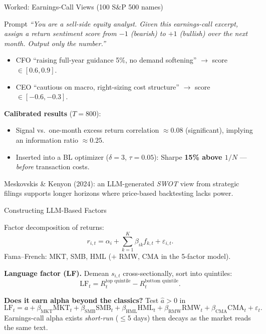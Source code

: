 \documentclass[9pt,t]{beamer}
\begin{document}
\begin{frame}{Worked: Earnings-Call Views (100 S\&P 500 names)}
\begin{exampleblock}{Prompt}
\textit{``You are a sell-side equity analyst. Given this earnings-call excerpt, assign
a return sentiment score from $-1$ (bearish) to $+1$ (bullish) over the next month.
Output only the number.''}
\end{exampleblock}

\begin{itemize}
  \item CFO ``raising full-year guidance 5\%, no demand softening'' $\to$ score $\in[0.6,0.9]$.
  \item CEO ``cautious on macro, right-sizing cost structure'' $\to$ score $\in[-0.6,-0.3]$.
\end{itemize}

\medskip
\textbf{Calibrated results} ($T=800$):
\begin{itemize}
  \item Signal vs.\ one-month excess return correlation $\approx 0.08$ (significant),
        implying an information ratio $\approx 0.25$.
  \item Inserted into a BL optimizer ($\delta=3$, $\tau=0.05$): Sharpe
        \textbf{15\% above $1/N$} --- \emph{before} transaction costs.
\end{itemize}

\medskip
\footnotesize Meskovskis \& Kenyon (2024): an LLM-generated \emph{SWOT} view from strategic
filings supports longer horizons where price-based backtesting lacks power.
\end{frame}

\begin{frame}{Constructing LLM-Based Factors}
\begin{underhood}
Factor decomposition of returns:
\[
r_{i,t}=\alpha_i+\sum_{k=1}^{K}\beta_{ik}f_{k,t}+\varepsilon_{i,t}.
\]
Fama--French: MKT, SMB, HML ($+$ RMW, CMA in the 5-factor model).
\end{underhood}

\medskip
\textbf{Language factor (LF).} Demean $s_{i,t}$ cross-sectionally, sort into quintiles:
\[
\text{LF}_t = R_t^{\text{top quintile}} - R_t^{\text{bottom quintile}}.
\]

\textbf{Does it earn alpha beyond the classics?} Test $\hat a>0$ in
\[
\text{LF}_t=a+\beta_{\text{MKT}}\text{MKT}_t+\beta_{\text{SMB}}\text{SMB}_t
+\beta_{\text{HML}}\text{HML}_t+\beta_{\text{RMW}}\text{RMW}_t+\beta_{\text{CMA}}\text{CMA}_t+\varepsilon_t.
\]
Earnings-call alpha exists \emph{short-run} ($\le 5$ days) then decays as the market reads the same text.
\end{frame}
\end{document}
